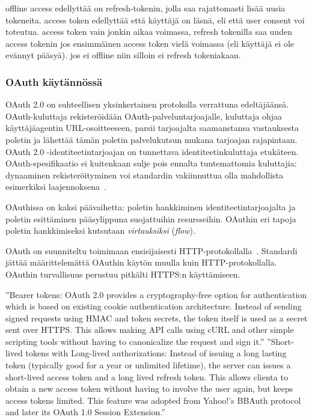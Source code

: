 \documentclass[finnish,gradu]{tktltiki}
\begin{document}
  offline access edellyttää on refresh-tokenin, jolla saa rajattomasti lisää uusia tokeneita. access token edellyttää että käyttäjä on läsnä, eli että user consent voi toteutua. access token vain jonkin aikaa voimassa, refresh tokenilla saa uuden access tokenin jos ensimmäinen access token vielä voimassa (eli käyttäjä ei ole evännyt pääsyä). jos ei offline niin silloin ei refresh tokeniakaan.



  \subsubsection{OAuth käytännössä} %
  \label{ssub:oauth_käytännössä}

  OAuth 2.0 on suhteellisen yksinkertainen protokolla verrattuna edeltäjäänsä. OAuth-kuluttaja rekisteröidään OAuth-palveluntarjoajalle, kuluttaja ohjaa käyttäjäagentin URL-osoitteeseen, parsii tarjoajalta saamanstansa vastauksesta poletin ja lähettää tämän poletin palvelukutsun mukana tarjoajan rajapintaan. OAuth 2.0 -identiteetintarjoajan on tunnettava identiteetinkuluttaja etukäteen. OAuth-spesifikaatio ei kuitenkaan sulje pois ennalta tuntemattomia kuluttajia: dynaaminen rekisteröityminen voi standardin vakiinnuttua olla mahdollista esimerkiksi laajennoksena~\cite{ietf_oauth2_unregistered_clients}.

  OAuthissa on kaksi päävaihetta: poletin hankkiminen identiteetintarjoajalta ja poletin esittäminen pääsylippuna suojattuihin resursseihin. OAuthin eri tapoja poletin hankkimiseksi kutsutaan \emph{virtauksiksi} (\emph{flow}).
  \cite{hueniverse_oauth_intro}


  OAuth on suunniteltu toimimaan ensisijaisesti HTTP-protokollalla~\cite{ietf_oauth2}.
  Standardi jättää määrittelemättä OAuthin käytön muulla kuin HTTP-protokollalla.
  OAuthin turvallisuus perustuu pitkälti HTTPS:n käyttämiseen.


  ''Bearer tokens: OAuth 2.0 provides a cryptography-free option for authentication which is based on existing cookie authentication architecture. Instead of sending signed requests using HMAC and token secrets, the token itself is used as a secret sent over HTTPS. This allows making API calls using cURL and other simple scripting tools without having to canonicalize the request and sign it.''
  ''Short-lived tokens with Long-lived authorizations: Instead of issuing a long lasting token (typically good for a year or unlimited lifetime), the server can issues a short-lived access token and a long lived refresh token. This allows clienta to obtain a new access token without having to involve the user again, but keeps access tokens limited. This feature was adopted from Yahoo!’s BBAuth protocol and later its OAuth 1.0 Session Extension.''
\end{document}
